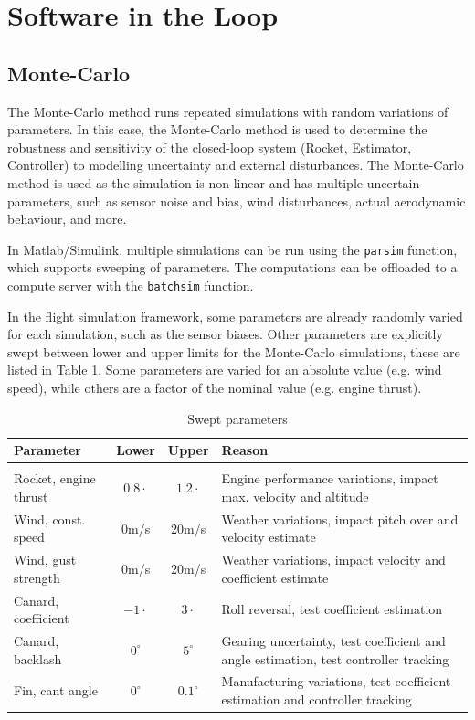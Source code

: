 \section{Software in the Loop}

\subsection{Monte-Carlo}

The Monte-Carlo method runs repeated simulations with random variations of parameters.
In this case, the Monte-Carlo method is used to determine the robustness and sensitivity of the closed-loop system (Rocket, Estimator, Controller) to modelling uncertainty and external disturbances.
The Monte-Carlo method is used as the simulation is non-linear and has multiple uncertain parameters, such as sensor noise and bias, wind disturbances, actual aerodynamic behaviour, and more. 

In Matlab/Simulink, multiple simulations can be run using the \texttt{parsim} function, which supports sweeping of parameters.
The computations can be offloaded to a compute server with the \texttt{batchsim} function.

In the flight simulation framework, some parameters are already randomly varied for each simulation, such as the sensor biases.
Other parameters are explicitly swept between lower and upper limits for the Monte-Carlo simulations, these are listed in Table \ref{tab:monte-carlo-params}. 
Some parameters are varied for an absolute value (e.g. wind speed), while others are a factor of the nominal value (e.g. engine thrust).

\begin{table}[ht]
    \centering
    \begin{tabularx}{\linewidth}{l c c X }
         Parameter & Lower & Upper & Reason \\[0.2em]
         \hline \\[-1em]
         Rocket, engine thrust & $0.8\cdot$ & $1.2\cdot$ & Engine performance variations, impact max. velocity  and altitude \\
         Wind, const. speed & 0m/s & 20m/s & Weather variations, impact pitch over and velocity estimate \\
         Wind, gust strength & 0m/s & 20m/s & Weather variations, impact velocity and coefficient estimate \\
         Canard, coefficient & $-1\cdot$ & $3\cdot$ & Roll reversal, test coefficient estimation \\
         Canard, backlash & $0^\circ$ & $5^\circ$ & Gearing uncertainty, test coefficient and angle estimation, test controller tracking \\
         Fin, cant angle & $0^\circ$ & $0.1^\circ$ & Manufacturing variations, test coefficient estimation and controller tracking
    \end{tabularx}
    \caption{Swept parameters}
    \label{tab:monte-carlo-params}
\end{table}

